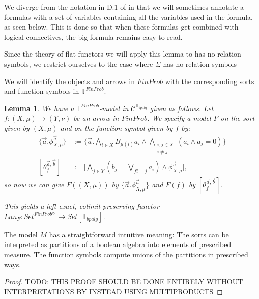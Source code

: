 \documentclass[a4paper]{amsproc}
\theoremstyle{plain}
\newtheorem{lemma}[theorem]{Lemma}
\theoremstyle{definition}
\theoremstyle{remark}
\numberwithin{equation}{section}
\begin{document}
We diverge from the notation in D.1 of \cite{elephant} in that we will sometimes annotate a formulas with a set of variables containing all the variables used in the formula, as seen below. This is done so that when these formulas get combined with logical connectives, the big formula remains easy to read.

Since the theory of flat functors we will apply this lemma to has no relation symbols, we restrict ourselves to the case where $\Sigma$ has no relation symbols

We will identify the objects and arrows in $FinProb$ with the corresponding sorts and function symbols in $\mathbb{T}^{FinProb}$.

\begin{lemma} \label{inverse}
We have a $\mathbb{T}^{FinProb}$-model in $\mathcal{C}^{\mathbb{T}_{bpalg}}$ given as follows. Let $f: (X,\mu) \to (Y, \nu)$ be an arrow in $FinProb$. We specify a model $F$ on the sort given by $(X,\mu)$ and on the function symbol given by $f$ by:
\begin{align*}
\{\vec{a} . \phi_{X,\mu}^{\vec{a}}\} &:= \Bigg \{ \vec{a} . \bigwedge_{i \in X} B_{\mu(i)} a_i \wedge \bigwedge_{\substack{i,j \in X \\ i \neq j}} (a_i \wedge a_j = 0) \Bigg \} \\
[\theta_f^{\vec{a}, \vec{b}}] &:= \Bigg [ \bigwedge_{j \in Y} (b_j = \bigvee_{f i = j} a_i) \wedge \phi_{X,\mu}^{\vec{a}} \Bigg] ,
\end{align*}
so now we can give $F((X,\mu))$ by $\{\vec{a} . \phi_{X,\mu}^{\vec{a}}\}$ and $F(f)$ by $[\theta_f^{\vec{a}, \vec{b}}]$.

This yields a left-exact, colimit-preserving functor $Lan_F: Set^{FinProb^{op}} \to Set[\mathbb{T}_{bpalg}]$.
\end{lemma}

The model $M$ has a straightforward intuitive meaning: The sorts can be interpreted as partitions of a boolean algebra into elements of prescribed measure. The function symbols compute unions of the partitions in prescribed ways.

\begin{proof}
TODO: THIS PROOF SHOULD BE DONE ENTIRELY WITHOUT INTERPRETATIONS BY INSTEAD USING MULTIPRODUCTS

\end{proof}
\end{document}
